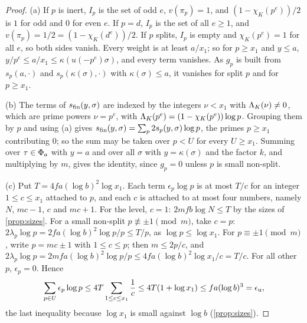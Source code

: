 \begin{proof}
(a) If $p$ is inert, $I_p$ is the set of odd $e$, $v(\pi_p)=1$, and $(1-\chi_K(p^e))/2$ is $1$ for odd and $0$ for even $e$. If $p=d$, $I_p$ is the set of all $e\ge1$, and $v(\pi_p)=1/2=(1-\chi_K(d^e))/2$. If $p$ splits, $I_p$ is empty and $\chi_K(p^e)=1$ for all $e$, so both sides vanish. Every weight is at least $a/x_1$; so for $p\ge x_1$ and $y\le a$,
$y/p^e\le a/x_1\le\kappa(u(-p^e)\sigma)$, and every term vanishes. As $g_p$ is built from $s_p(a,\cdot)$ and $s_p(\kappa(\sigma),\cdot)$ with $\kappa(\sigma)\le a$, it vanishes for split $p$ and for $p\ge x_1$.

(b) The terms of $s_{\mathrm{fin}}(y,\sigma)$ are indexed by the integers $\nu<x_1$ with $\Lambda_K(\nu)\ne0$, which are prime powers $\nu=p^e$, with $\Lambda_K(p^e)=(1-\chi_K(p^e))\log p$. Grouping them by $p$ and using (a) gives $s_{\mathrm{fin}}(y,\sigma)=\sum_p2s_p(y,\sigma)\log p$, the primes $p\ge x_1$ contributing $0$; so the sum may be taken over $p<U$ for every $U\ge x_1$. Summing over
$\tau\in\Phi_a$ with $y=a$ and over all $\sigma$ with $y=\kappa(\sigma)$ and the factor $k$, and multiplying by $m$, gives the identity, since $g_p=0$ unless $p$ is small non-split.

(c) Put $T=4fa(\log b)^2\log x_1$. Each term $\epsilon_p\log p$ is at most $T/c$ for an integer $1\le c\le x_1$ attached to $p$, and each $c$ is attached to at most four numbers, namely $N$, $mc-1$, $c$ and $mc+1$. For the level, $c=1$: $2mfb\log N\le T$ by the sizes of \cref{prop:sizes}. For a small non-split $p\not\equiv\pm1\pmod m$, take $c=p$:
$2\lambda_p\log p=2fa(\log b)^2\log p/p\le T/p$, as $\log p\le\log x_1$. For $p\equiv\pm1\pmod m$, write $p=mc\pm1$ with $1\le c\le p$; then $m\le2p/c$, and $2\lambda_p\log p=2mfa(\log b)^2\log p/p\le4fa(\log b)^2\log x_1/c=T/c$. For all other $p$, $\epsilon_p=0$. Hence
\[
  \sum_{p\in U}\epsilon_p\log p\le4T\sum_{1\le c\le x_1}\frac1c\le4T(1+\log x_1)\le fa(\log b)^3=\epsilon_{\mathrm{u}} ,
\]
the last inequality because $\log x_1$ is small against $\log b$ (\cref{prop:sizes}).


\end{proof}
